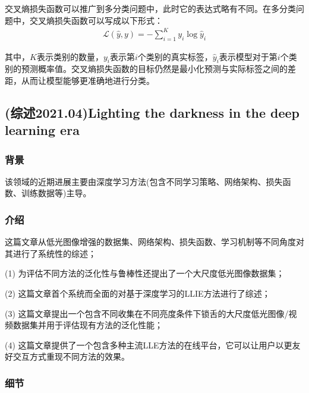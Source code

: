 \documentclass[letterpaper,12pt]{article}
\begin{document}
			交叉熵损失函数可以推广到多分类问题中，此时它的表达式略有不同。在多分类问题中，交叉熵损失函数可以写成以下形式： 
			\begin{equation}
				\begin{aligned}
					\mathcal{L}(\hat{y},y)=-\sum_{i=1}^K y_i \log \hat{y}_i
				\end{aligned}
				\label{eq: Cross-entropy loss}
			\end{equation} 
			
			其中，$K$表示类别的数量，$y_i$表示第$i$个类别的真实标签，$\hat{y}_i$表示模型对于第$i$个类别的预测概率值。交叉熵损失函数的目标仍然是最小化预测与实际标签之间的差距，从而让模型能够更准确地进行分类。
			
	\subsection{(综述2021.04)Lighting the darkness in the deep learning era}
	
	\subsubsection{背景}
	
	该领域的近期进展主要由深度学习方法(包含不同学习策略、网络架构、损失函数、训练数据等)主导。
	
	\subsubsection{介绍}
	
	这篇文章从低光图像增强的数据集、网络架构、损失函数、学习机制等不同角度对其进行了系统性的综述；
	
	(1) 为评估不同方法的泛化性与鲁棒性还提出了一个大尺度低光图像数据集；
	
	(2) 这篇文章首个系统而全面的对基于深度学习的LLIE方法进行了综述；
	
	(3) 这篇文章提出一个包含不同收集在不同亮度条件下锁舌的大尺度低光图像/视频数据集并用于评估现有方法的泛化性能；
	
	(4) 这篇文章提供了一个包含多种主流LLE方法的在线平台，它可以让用户以更友好交互方式重现不同方法的效果。
	
	
	\subsubsection{细节}
	
	\renewcommand{\tablename}{Table}
	
	
\end{document}
